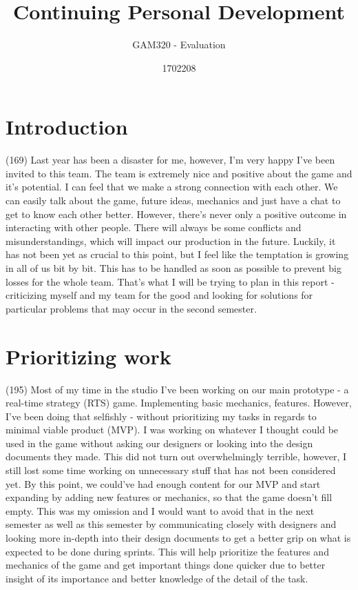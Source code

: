 \documentclass{scrartcl}
\title{Continuing Personal Development} %
\subtitle{GAM320 - Evaluation}
\author{1702208}
\begin{document}
\maketitle

\section{Introduction} (169)
Last year has been a disaster for me, however, I'm very happy I've been invited to this team. The team is extremely nice and positive about the game and it's potential. I can feel that we make a strong connection with each other. We can easily talk about the game, future ideas, mechanics and just have a chat to get to know each other better. However, there's never only a positive outcome in interacting with other people. There will always be some conflicts and misunderstandings, which will impact our production in the future. Luckily, it has not been yet as crucial to this point, but I feel like the temptation is growing in all of us bit by bit. This has to be handled as soon as possible to prevent big losses for the whole team. That's what I will be trying to plan in this report - criticizing myself and my team for the good and looking for solutions for particular problems that may occur in the second semester.

\section{Prioritizing work} (195)
Most of my time in the studio I've been working on our main prototype - a real-time strategy (RTS) game. Implementing basic mechanics, features. However, I've been doing that selfishly - without prioritizing my tasks in regards to minimal viable product (MVP). I was working on whatever I thought could be used in the game without asking our designers or looking into the design documents they made. This did not turn out overwhelmingly terrible, however, I still lost some time working on unnecessary stuff that has not been considered yet. By this point, we could've had enough content for our MVP and start expanding by adding new features or mechanics, so that the game doesn't fill empty. This was my omission and I would want to avoid that in the next semester as well as this semester by communicating closely with designers and looking more in-depth into their design documents to get a better grip on what is expected to be done during sprints. This will help prioritize the features and mechanics of the game and get important things done quicker due to better insight of its importance and better knowledge of the detail of the task.
\end{document}
